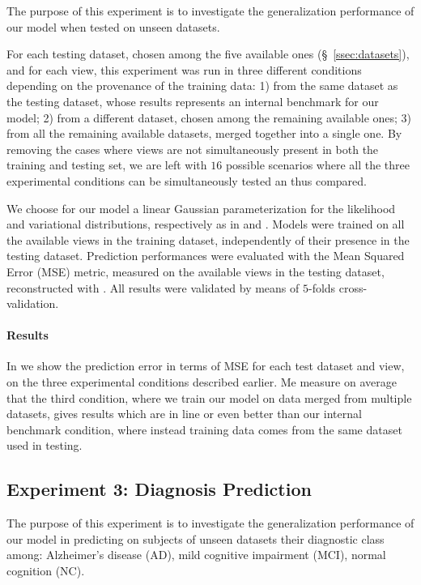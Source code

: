 The purpose of this experiment is to investigate the generalization performance of our model when tested on unseen datasets.

For each testing dataset, chosen among the five available ones (\S~\ref{ssec:datasets}), and for each view, this experiment was run in three different conditions depending on the provenance of the training data:
1) from the same dataset as the testing dataset, whose results represents an internal benchmark for our model;
2) from a different dataset, chosen among the remaining available ones;
3) from all the remaining available datasets, merged together into a single one.
By removing the cases where views are not simultaneously present in both the training and testing set,
we are left with $16$ possible scenarios where all the three experimental conditions can be simultaneously tested an thus compared.

We choose for our model a linear Gaussian parameterization for the likelihood and variational distributions, respectively as in  and .
Models were trained on all the available views in the training dataset, independently of their presence in the testing dataset.
Prediction performances were evaluated with the Mean Squared Error (MSE) metric, measured on the available views in the testing dataset, reconstructed with .
All results were validated by means of $5$-folds cross-validation.

\paragraph{Results}
In  we show the prediction error in terms of MSE for each test dataset and view, on the three experimental conditions described earlier.
Me measure on average that the third condition, where we train our model on data merged from multiple datasets, gives results which are in line or even better than our internal benchmark condition, where instead training data comes from the same dataset used in testing.

\subsection{Experiment 3: Diagnosis Prediction}


The purpose of this experiment is to investigate the generalization performance of our model in predicting on subjects of unseen datasets their diagnostic class among:
Alzheimer's disease (AD),
mild cognitive impairment (MCI),
normal cognition (NC).

